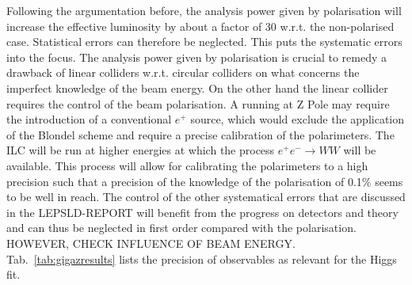 Following the argumentation before, the analysis power given by polarisation will increase the effective luminosity by about a factor of 30 w.r.t. the non-polarised case. Statistical errors can therefore be neglected. This puts the systematic errors into the focus. The analysis power given by polarisation is crucial to remedy a drawback of linear colliders w.r.t. circular colliders on what concerns the imperfect knowledge of the beam energy. On the other hand the linear collider requires the control of the beam polarisation. A running at Z Pole may require the introduction of a conventional $e^+$ source, which would exclude the application of the Blondel scheme and require a precise calibration of the polarimeters. The ILC will be run at higher energies at which the process $e^+e^- \rightarrow WW$ will be available. This process will allow for calibrating the polarimeters to a high precision such that a precision of the knowledge of the polarisation of 0.1\% seems to be well in reach. The control of the other systematical errors that are discussed in the LEPSLD-REPORT will benefit from the progress on detectors and theory and can thus be neglected in first order compared with the polarisation. HOWEVER, CHECK INFLUENCE OF BEAM ENERGY. Tab.~\ref{tab:gigazresults} lists the precision of observables as relevant for the Higgs fit. 

